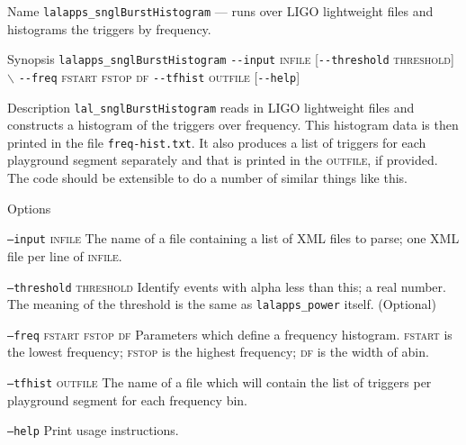 \begin{entry}

\item[Name]
\verb$lalapps_snglBurstHistogram$ --- runs over LIGO lightweight files and histograms
the triggers by frequency.   

\item[Synopsis]
\verb$lalapps_snglBurstHistogram$ \verb$--input$ \textsc{infile} 
[\verb$--threshold$ \textsc{threshold}]    
$\backslash$ \newline \hspace*{0.25in}
\verb$--freq$ \textsc{fstart} \textsc{fstop} \textsc{df}
\verb$--tfhist$ \textsc{outfile} 
[\verb$--help$]

\item[Description] 
\verb$lal_snglBurstHistogram$ reads in LIGO lightweight files and
constructs a histogram of the triggers over frequency. This histogram data 
is then printed in the file \verb$freq-hist.txt$. It also produces a list of triggers for each playground segment separately and that is printed in the \textsc{outfile}, if provided.   The code
should be extensible to do a number of similar things like this.

\item[Options]\leavevmode
\begin{entry}
\item[\texttt{--input}  \textsc{infile}] The name of a file containing
a list of XML files to parse;  one XML file per line of
\textsc{infile}.

\item[\texttt{--threshold} \textsc{threshold}] Identify events with alpha
less than this; a real number.  The meaning of the threshold is the same as
\verb$lalapps_power$ itself.  (Optional)

\item[\texttt{--freq} \textsc{fstart} \textsc{fstop} \textsc{df}]
Parameters which define a frequency histogram.  \textsc{fstart} is the
lowest frequency;  \textsc{fstop} is the highest frequency; \textsc{df} 
is the width of abin.

\item[\texttt{--tfhist}  \textsc{outfile}] The name of a file which will 
contain the list of triggers per playground segment for each frequency bin.

\item[\texttt{--help}] Print usage instructions.
\end{entry}



\end{entry}

